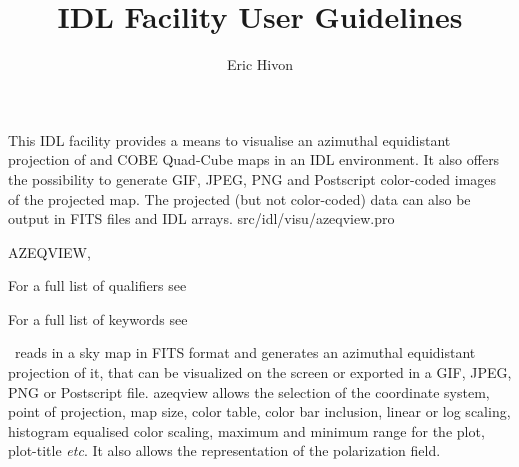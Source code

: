 




\sloppy



\title{\healpix IDL Facility User Guidelines}
 \section[azeqview]{ }
\label{idl:\thedocid}
\author{Eric Hivon}



\begin{facility}
{This IDL facility provides a means to visualise an azimuthal equidistant projection 
 of
\healpix and COBE Quad-Cube maps in an IDL environment. 
It also offers the possibility to
generate GIF, JPEG, PNG and Postscript color-coded images of the projected map.
The projected (but not color-coded) data can also be output in FITS files and
IDL arrays.}
{src/idl/visu/azeqview.pro}
\end{facility}

\begin{IDLformat}
{AZEQVIEW, 

}
\end{IDLformat}

\begin{qualifiers}
  \begin{qulist}{} %
\item [{\  }] For a full list of qualifiers see 
  \end{qulist}
\end{qualifiers}

\begin{keywords}
  \begin{kwlist}{} %
\item [{\  }] For a full list of keywords see 
  \end{kwlist}
\end{keywords}


\begin{codedescription}
{\thedocid\ reads in a \healpix sky map in FITS format and generates an
azimuthal equidistant projection of it, that can be visualized on the screen or
exported in a GIF, JPEG, PNG or Postscript file. azeqview allows the selection of
the coordinate system, point of projection, map size, color table, color bar inclusion,
linear or log scaling, histogram equalised
color scaling, maximum and 
minimum range for the plot, plot-title {\it etc}. It also allows the representation of the
polarization field. }
\end{codedescription}

